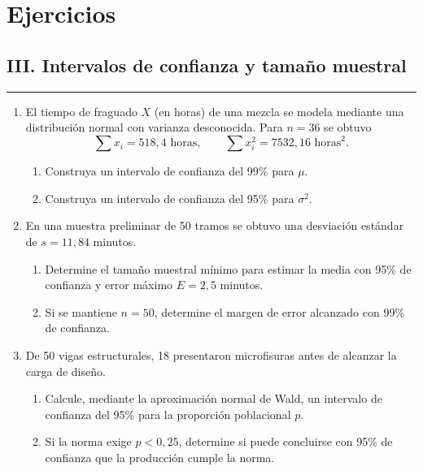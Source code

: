 \documentclass[letterpaper,12pt]{article}
\newenvironment{ejercicios}{%
    \section*{Ejercicios}
}{}
\begin{document}
\begin{ejercicios}
\begin{enumerate}[resume,leftmargin=*,itemsep=0.9em]
\end{enumerate}

\subsection*{III. Intervalos de confianza y tamaño muestral}
\hrule
\vspace{0.4cm}
\begingroup
\small

\begin{enumerate}[resume,leftmargin=*,itemsep=0.9em]

    \item El tiempo de fraguado $X$ (en horas) de una mezcla se modela mediante una distribución normal con varianza desconocida. Para $n=36$ se obtuvo
    \[
        \sum x_i=518{,}4 \text{ horas},
        \qquad
        \sum x_i^2=7532{,}16 \text{ horas}^2.
    \]
    \begin{enumerate}[label=\alph*)]
        \item Construya un intervalo de confianza del 99\% para $\mu$.
        \item Construya un intervalo de confianza del 95\% para $\sigma^2$.
    \end{enumerate}

    \item En una muestra preliminar de 50 tramos se obtuvo una desviación estándar de $s=11{,}84$ minutos.
    \begin{enumerate}[label=\alph*)]
        \item Determine el tamaño muestral mínimo para estimar la media con 95\% de confianza y error máximo $E=2{,}5$ minutos.
        \item Si se mantiene $n=50$, determine el margen de error alcanzado con 99\% de confianza.
    \end{enumerate}

    \item De 50 vigas estructurales, 18 presentaron microfisuras antes de alcanzar la carga de diseño.
    \begin{enumerate}[label=\alph*)]
        \item Calcule, mediante la aproximación normal de Wald, un intervalo de confianza del 95\% para la proporción poblacional $p$.
        \item Si la norma exige $p<0{,}25$, determine si puede concluirse con 95\% de confianza que la producción cumple la norma.
    \end{enumerate}


\end{enumerate}
\end{ejercicios}
\end{document}
